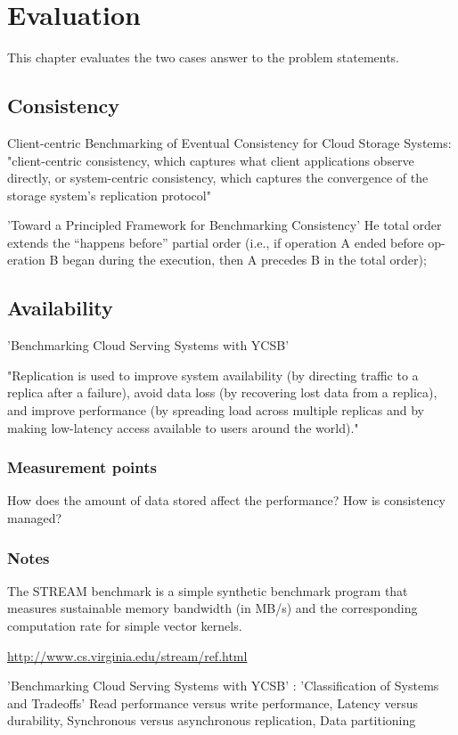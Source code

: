 \chapter{Evaluation}

This chapter evaluates the two cases answer to the problem statements.

\section{Consistency}
Client-centric Benchmarking of Eventual Consistency for Cloud Storage Systems: "client-centric consistency, which captures what client applications observe directly, or system-centric consistency, which captures the convergence of the storage system’s replication protocol"

'Toward a Principled Framework for Benchmarking Consistency'
He total order extends the “happens before” partial order (i.e., if operation A ended before op- eration B began during the execution, then A precedes B in the total order);

\section{Availability}
'Benchmarking Cloud Serving Systems with YCSB'

"Replication is used to improve system availability (by directing traffic to a replica after a failure), avoid data loss (by recovering lost data from a replica), and improve performance (by spreading load across multiple replicas and by making low-latency access available to users around the world)."

\subsection{Measurement points}
How does the amount of data stored affect the performance?
How is consistency managed?

\subsection*{Notes}

The STREAM benchmark is a simple synthetic benchmark program that measures sustainable memory bandwidth (in MB/s) and the corresponding computation rate for simple vector kernels. 

\url{http://www.cs.virginia.edu/stream/ref.html}


'Benchmarking Cloud Serving Systems with YCSB' : 'Classification of Systems and Tradeoffs'
Read performance versus write performance, Latency versus durability, Synchronous versus asynchronous replication, Data partitioning